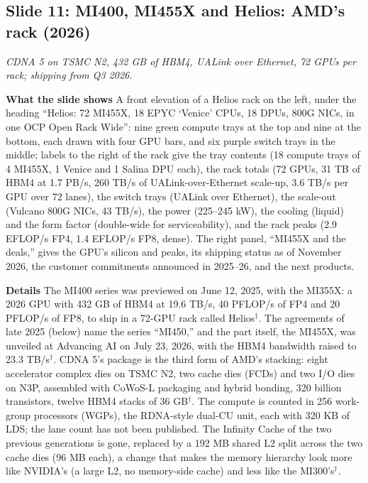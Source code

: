 \documentclass[11pt,letterpaper]{article}
\newcommand{\slide}[3]{%
  \subsection[Slide #1: #2]{Slide #1: #2}%
  {\color{muted}\itshape #3\par}\medskip}
\newcommand{\para}[1]{\medskip\noindent\textbf{#1}\quad}
\begin{document}
\slide{11}{MI400, MI455X and Helios: AMD's rack (2026)}{CDNA 5 on TSMC N2, 432 GB of HBM4, UALink over Ethernet, 72 GPUs per rack; shipping from Q3 2026.}

\para{What the slide shows} A front elevation of a Helios rack on the left, under the heading ``Helios: 72 MI455X, 18 EPYC `Venice' CPUs, 18 DPUs, 800G NICs, in one OCP Open Rack Wide'': nine green compute trays at the top and nine at the bottom, each drawn with four GPU bars, and six purple switch trays in the middle; labels to the right of the rack give the tray contents (18 compute trays of 4 MI455X, 1 Venice and 1 Salina DPU each), the rack totals (72 GPUs, 31 TB of HBM4 at 1.7 PB/s, 260 TB/s of UALink-over-Ethernet scale-up, 3.6 TB/s per GPU over 72 lanes), the switch trays (UALink over Ethernet), the scale-out (Vulcano 800G NICs, 43 TB/s), the power (225--245 kW), the cooling (liquid) and the form factor (double-wide for serviceability), and the rack peaks (2.9 EFLOP/s FP4, 1.4 EFLOP/s FP8, dense). The right panel, ``MI455X and the deals,'' gives the GPU's silicon and peaks, its shipping status as of November 2026, the customer commitments announced in 2025--26, and the next products.

\para{Details} The MI400 series was previewed on June 12, 2025, with the MI355X: a 2026 GPU with 432 GB of HBM4 at 19.6 TB/s, 40 PFLOP/s of FP4 and 20 PFLOP/s of FP8, to ship in a 72-GPU rack called Helios$^\dagger$. The agreements of late 2025 (below) name the series ``MI450,'' and the part itself, the MI455X, was unveiled at Advancing AI on July 23, 2026, with the HBM4 bandwidth raised to 23.3 TB/s$^\dagger$. CDNA 5's package is the third form of AMD's stacking: eight accelerator complex dies on TSMC N2, two cache dies (FCDs) and two I/O dies on N3P, assembled with CoWoS-L packaging and hybrid bonding, 320 billion transistors, twelve HBM4 stacks of 36 GB$^\dagger$. The compute is counted in 256 work-group processors (WGPs), the RDNA-style dual-CU unit, each with 320 KB of LDS; the lane count has not been published. The Infinity Cache of the two previous generations is gone, replaced by a 192 MB shared L2 split across the two cache dies (96 MB each), a change that makes the memory hierarchy look more like NVIDIA's (a large L2, no memory-side cache) and less like the MI300's$^\dagger$.
\end{document}
